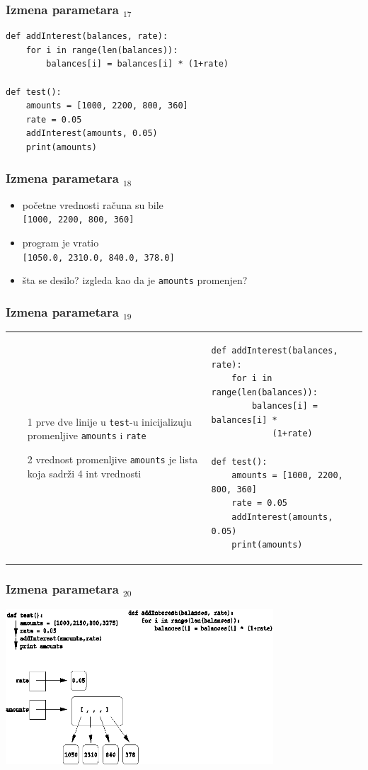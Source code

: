 \documentclass[compress]{beamer}
\begin{document}
\begin{frame}[fragile]
  \frametitle{Izmena parametara $_{17}$}
\begin{verbatim}
def addInterest(balances, rate):
    for i in range(len(balances)):
        balances[i] = balances[i] * (1+rate)

def test():
    amounts = [1000, 2200, 800, 360]
    rate = 0.05
    addInterest(amounts, 0.05)
    print(amounts)
\end{verbatim}
\end{frame}

\begin{frame}[fragile]
  \frametitle{Izmena parametara $_{18}$}
  \begin{itemize}
    \item početne vrednosti računa su bile \\
      \texttt{[1000, 2200, 800, 360]}
    \item program je vratio \\
      \texttt{[1050.0, 2310.0, 840.0, 378.0]}
    \item šta se desilo? izgleda kao da je \texttt{amounts} promenjen?
  \end{itemize}
\end{frame}

\begin{frame}[fragile,shrink=10]
  \frametitle{Izmena parametara $_{19}$}
\begin{tabular}{p{4cm}p{8cm}}
  \begin{itemize}
    \item[1] prve dve linije u \texttt{test}-u inicijalizuju promenljive \texttt{amounts} i \texttt{rate}
    \item[2] vrednost promenljive \texttt{amounts} je lista koja sadrži 4 int vrednosti
  \end{itemize}
&
\begin{verbatim}
def addInterest(balances, rate):
    for i in range(len(balances)):
        balances[i] = balances[i] * 
            (1+rate)

def test():
    amounts = [1000, 2200, 800, 360]
    rate = 0.05
    addInterest(amounts, 0.05)
    print(amounts)
\end{verbatim}
\end{tabular}
\end{frame}

\begin{frame}[fragile]
  \frametitle{Izmena parametara $_{20}$}
\begin{center}
  \includegraphics[width=10cm]{pic11}
\end{center}
\end{frame}
\end{document}
